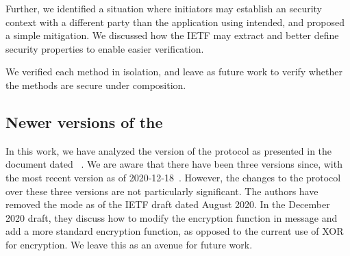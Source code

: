 \documentclass[runningheads, envcountsame, hidelinks, a4paper, draft, x11names]{llncs}
\begin{document}
Further, we identified a situation where initiators may establish an \mOscore{}
security context with a different party than the application using \mEdhoc{}
intended, and proposed a simple mitigation.
%
We discussed how the IETF may extract and better define security properties to
enable easier verification.

We verified each method in isolation, and leave as future work to verify whether
the methods are secure under composition.

\subsection{Newer versions of the \mSpec} \label{sec:newdrafts}
In this work, we have analyzed the version of the \mEdhoc{} protocol as
presented in the \mSpec{} document dated \mDate~\cite{our-analysis-selander-lake-edhoc-01}.
We are aware that there have been three versions since, with the most recent version as of 2020-12-18~\cite{latest-ietf-lake-edhoc-03}. 
However, the changes to the protocol over these three versions are not particularly significant. 
The authors have removed the \mPskPsk{} mode as of the IETF draft dated August
2020. In the December 2020 draft, they discuss how to modify the encryption
function in message \mMsgtwo{} and add a more standard encryption function, as opposed to the current use of XOR for encryption. 
We leave this as an avenue for future work. 


%
%


%
%
\end{document}
